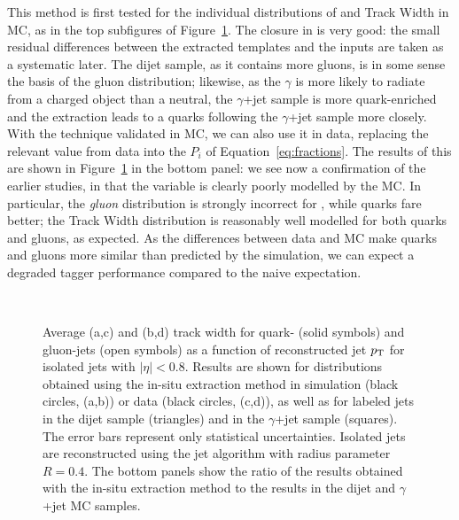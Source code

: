 This method is first tested for the individual distributions of \ntrk and Track Width in MC, as in the top subfigures of Figure~\ref{fig:jet-reconstruction:qg:ntrkWidthClos}. The closure in \Pythia is very good: the small residual differences between the extracted templates and the inputs are taken as a systematic later. The dijet sample, as it contains more gluons, is in some sense the basis of the gluon distribution; likewise, as the $\gamma$ is more likely to radiate from a charged object than a neutral, the $\gamma$+jet sample is more quark-enriched and the extraction leads to a quarks following the $\gamma$+jet sample more closely. With the technique validated in MC, we can also use it in data, replacing the relevant value from data into the $P_i$ of Equation~\ref{eq:fractions}. The results of this are shown in Figure~\ref{fig:jet-reconstruction:qg:ntrkWidthClos} in the bottom panel: we see now a confirmation of the earlier studies, in that the \ntrk variable is clearly poorly modelled by the MC. In particular, the \textit{gluon} distribution is strongly incorrect for \ntrk, while quarks fare better; the Track Width distribution is reasonably well modelled for both quarks and gluons, as expected. As the differences between data and MC make quarks and gluons more similar than predicted by the simulation, we can expect a degraded tagger performance compared to the naive expectation.


\begin{figure}[p]
\begin{center}
 \\
\caption{ Average (a,c) \ntrk and (b,d) track width for quark- (solid symbols) and gluon-jets
(open symbols) as a function of reconstructed jet $p_{\text{T}}$ for isolated jets with $|\eta|<0.8$.
Results are shown for distributions obtained using the in-situ extraction method in
 simulation (black circles, (a,b)) or data (black circles, (c,d)), as well as for 
labeled jets in the dijet sample (triangles) and in the $\gamma$+jet sample (squares).
The error bars represent only statistical uncertainties. Isolated jets are reconstructed using the
\akt jet algorithm with radius parameter $R=0.4$. The bottom panels show
the ratio of the results obtained with the in-situ extraction method to the results
in the dijet and $\gamma$+jet MC samples. }
\label{fig:jet-reconstruction:qg:ntrkWidthClos}
\end{center}
\end{figure}

